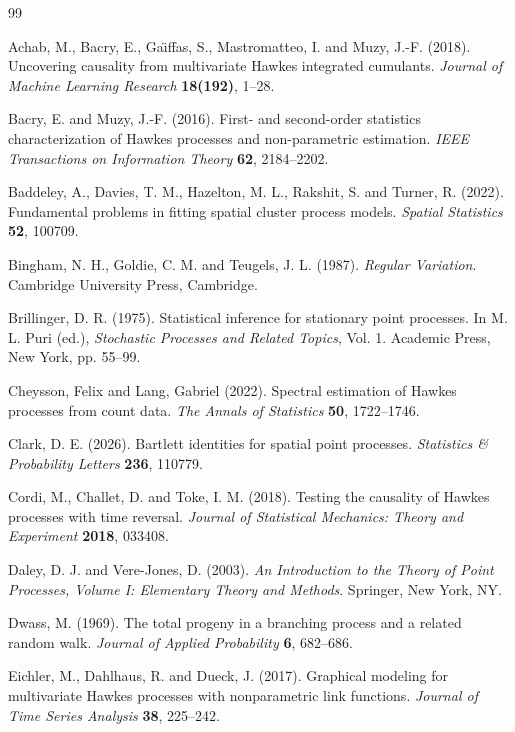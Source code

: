\documentclass[aap,press]{apt} \volno{00} \partno{00}
\newcommand{\1}{\mathbf{1}}
\numberwithin{equation}{section}
\begin{document}
{\footnotesize

\begin{thebibliography}{99}

Achab, M., Bacry, E., Ga{\"\i}ffas, S., Mastromatteo, I. and Muzy, J.-F. (2018).
Uncovering causality from multivariate {H}awkes integrated cumulants.
\emph{Journal of Machine Learning Research} \textbf{18(192)}, 1--28.

Bacry, E. and Muzy, J.-F. (2016).
First- and second-order statistics characterization of {H}awkes processes and non-parametric estimation.
\emph{IEEE Transactions on Information Theory} \textbf{62}, 2184--2202.

Baddeley, A., Davies, T. M., Hazelton, M. L., Rakshit, S. and Turner, R. (2022).
Fundamental problems in fitting spatial cluster process models.
\emph{Spatial Statistics} \textbf{52}, 100709.

Bingham, N. H., Goldie, C. M. and Teugels, J. L. (1987).
\emph{Regular Variation}.
Cambridge University Press, Cambridge.

Brillinger, D. R. (1975).
Statistical inference for stationary point processes.
In M. L. Puri (ed.), \emph{Stochastic Processes and Related Topics}, Vol. 1.
Academic Press, New York, pp. 55--99.

Cheysson, Felix and Lang, Gabriel (2022).
Spectral estimation of Hawkes processes from count data.
\emph{The Annals of Statistics} \textbf{50}, 1722--1746.

Clark, D. E. (2026).
Bartlett identities for spatial point processes.
\emph{Statistics \& Probability Letters} \textbf{236}, 110779.

Cordi, M., Challet, D. and Toke, I. M. (2018).
Testing the causality of {H}awkes processes with time reversal.
\emph{Journal of Statistical Mechanics: Theory and Experiment} \textbf{2018}, 033408.

Daley, D. J. and Vere-Jones, D. (2003).
\emph{An Introduction to the Theory of Point Processes, Volume I: Elementary Theory and Methods}.
Springer, New York, NY.

Dwass, M. (1969).
The total progeny in a branching process and a related random walk.
\emph{Journal of Applied Probability} \textbf{6}, 682--686.

Eichler, M., Dahlhaus, R. and Dueck, J. (2017).
Graphical modeling for multivariate {H}awkes processes with nonparametric link functions.
\emph{Journal of Time Series Analysis} \textbf{38}, 225--242.


\end{thebibliography}}
\end{document}
